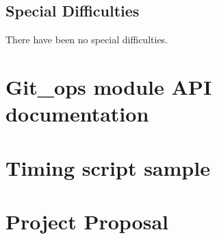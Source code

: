 \documentclass[12pt,a4paper,twoside,openright]{report}
\begin{document}
\section*{Special Difficulties}

There have been no special difficulties.

\newpage

\tableofcontents

\listoffigures

\newpage

\setcounter{page}{1}

\pagestyle{headings}











\printbibliography

\appendix

\chapter{Git\_ops module API documentation} \label{section:docs}


\chapter{Timing script sample} \label{section:bashtiming}



\chapter{Project Proposal}


\end{document}
